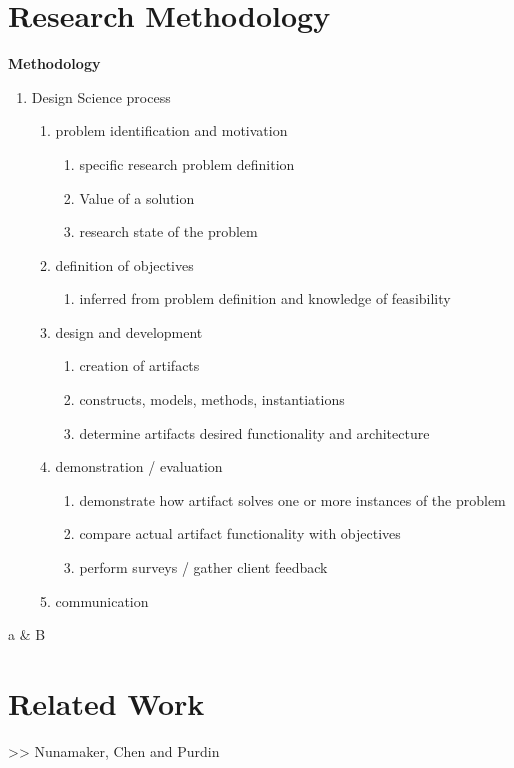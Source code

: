 
\section{Research Methodology} %
  \label{sec:research_methodology}

    \textbf{Methodology}
    \begin{enumerate}
      \item Design Science process \cite{Peffer}
      \begin{enumerate}
        \item problem identification and motivation
          \begin{enumerate}
            \item specific research problem definition
            \item Value of a solution
            \item research state of the problem
          \end{enumerate}
        \item definition of objectives
          \begin{enumerate}
            \item inferred from problem definition and knowledge of feasibility
          \end{enumerate}
        \item design and development
          \begin{enumerate}
            \item creation of artifacts
            \item constructs, models, methods, instantiations
            \item determine artifacts desired functionality and architecture
          \end{enumerate}
        \item demonstration / evaluation
          \begin{enumerate}
            \item demonstrate how artifact solves one or more instances of the problem
            \item compare actual artifact functionality with objectives
            \item perform surveys / gather client feedback
          \end{enumerate}
        \item communication
      \end{enumerate}
    \end{enumerate}

    a \& B


\section{Related Work} %
  \label{sec:related_work}




>> Nunamaker, Chen and Purdin


